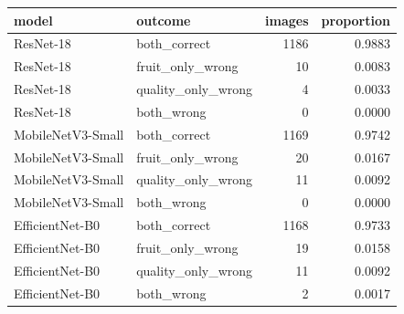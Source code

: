 \begin{tabular}{llrr}
\toprule
model & outcome & images & proportion \\
\midrule
ResNet-18 & both_correct & 1186 & 0.9883 \\
ResNet-18 & fruit_only_wrong & 10 & 0.0083 \\
ResNet-18 & quality_only_wrong & 4 & 0.0033 \\
ResNet-18 & both_wrong & 0 & 0.0000 \\
MobileNetV3-Small & both_correct & 1169 & 0.9742 \\
MobileNetV3-Small & fruit_only_wrong & 20 & 0.0167 \\
MobileNetV3-Small & quality_only_wrong & 11 & 0.0092 \\
MobileNetV3-Small & both_wrong & 0 & 0.0000 \\
EfficientNet-B0 & both_correct & 1168 & 0.9733 \\
EfficientNet-B0 & fruit_only_wrong & 19 & 0.0158 \\
EfficientNet-B0 & quality_only_wrong & 11 & 0.0092 \\
EfficientNet-B0 & both_wrong & 2 & 0.0017 \\
\bottomrule
\end{tabular}

